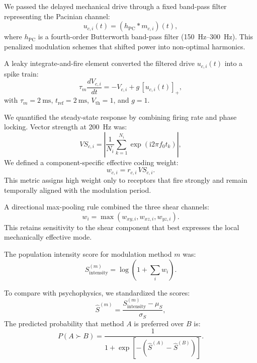 \documentclass[pdflatex, sn-nature]{sn-jnl}
\theoremstyle{thmstyleone}%
\theoremstyle{thmstyletwo}%
\theoremstyle{thmstylethree}%
\begin{document}
We passed the delayed mechanical drive through a fixed band-pass filter representing the Pacinian channel:
\begin{equation}
    u_{c,i}(t)=(h_{\mathrm{PC}} * m_{c,i})(t),
\end{equation}
where $h_{\mathrm{PC}}$ is a fourth-order Butterworth band-pass filter (\qty{150}{\hertz}--\qty{300}{\hertz}). This penalized modulation schemes that shifted power into non-optimal harmonics.

A leaky integrate-and-fire element converted the filtered drive $u_{c,i}(t)$ into a spike train:
\begin{equation}
    \tau_m\frac{dV_{c,i}}{dt}=-V_{c,i}+g\,[u_{c,i}(t)]_{+},
\end{equation}
with $\tau_m=\qty{2}{\milli\second}$, $t_{\mathrm{ref}}=\qty{2}{\milli\second}$, $V_{\mathrm{th}}=1$, and $g=1$.

We quantified the steady-state response by combining firing rate and phase locking. Vector strength at \qty{200}{\hertz} was:
\begin{equation}
    VS_{c,i}=\left|\frac{1}{N_i}\sum_{k=1}^{N_i} \exp\!\left(\mathrm{i}2\pi f_0 t_k\right)\right|,
\end{equation}
We defined a component-specific effective coding weight:
\begin{equation}
    w_{c,i}=r_{c,i}\,VS_{c,i}.
\end{equation}
This metric assigns high weight only to receptors that fire strongly and remain temporally aligned with the modulation period.

A directional max-pooling rule combined the three shear channels:
\begin{equation}
    w_i=\max\left(w_{xy,i},w_{xz,i},w_{yz,i}\right).
\end{equation}
This retains sensitivity to the shear component that best expresses the local mechanically effective mode.

The population intensity score for modulation method $m$ was:
\begin{equation}
    S^{(m)}_{\mathrm{intensity}}=\log\!\left(1+\sum_i w_i\right).
\end{equation}

To compare with psychophysics, we standardized the scores:
\begin{equation}
    \hat{S}^{(m)}=\frac{S^{(m)}_{\mathrm{intensity}}-\mu_S}{\sigma_S},
\end{equation}
The predicted probability that method $A$ is preferred over $B$ is:
\begin{equation}
    P(A \succ B)=\frac{1}{1+\exp\left[-\left(\hat{S}^{(A)}-\hat{S}^{(B)}\right)\right]}.
\end{equation}
\end{document}
